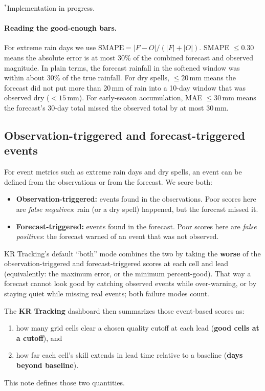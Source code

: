 \documentclass[11pt]{article}
\begin{document}
\vspace{-0.5em}
{\footnotesize \(^*\)Implementation in progress.}

\paragraph{Reading the good-enough bars.}
For extreme rain days we use
\(\mathrm{SMAPE}=|F-O|/(|F|+|O|)\).
SMAPE \(\le 0.30\) means the absolute error is at most 30\% of the combined
forecast and observed magnitude. In plain terms, the forecast rainfall in the
softened window was within about 30\% of the true rainfall.
For dry spells, \(\le 20\)\,mm means the forecast did not put more than 20\,mm
of rain into a 10-day window that was observed dry (\(<15\)\,mm).
For early-season accumulation, MAE \(\le 30\)\,mm means the forecast's 30-day
total missed the observed total by at most 30\,mm.

\subsection*{Observation-triggered and forecast-triggered events}

For event metrics such as extreme rain days and dry spells, an event can be
defined from the observations or from the forecast. We score both:

\begin{itemize}
  \item \textbf{Observation-triggered:} events found in the observations.
        Poor scores here are \emph{false negatives}: rain (or a dry spell)
        happened, but the forecast missed it.
  \item \textbf{Forecast-triggered:} events found in the forecast.
        Poor scores here are \emph{false positives}: the forecast warned of
        an event that was not observed.
\end{itemize}

KR Tracking's default ``both'' mode combines the two by taking the
\textbf{worse} of the observation-triggered and forecast-triggered scores
at each cell and lead (equivalently: the maximum error, or the minimum
percent-good). That way a forecast cannot look good by catching observed
events while over-warning, or by staying quiet while missing real events;
both failure modes count.

\vspace{0.5em}

The \textbf{KR Tracking} dashboard then summarizes those
event-based scores as:
\begin{enumerate}
  \item how many grid cells clear a chosen quality cutoff at each lead
        (\textbf{good cells at a cutoff}), and
  \item how far each cell's skill extends in lead time relative to a baseline
        (\textbf{days beyond baseline}).
\end{enumerate}
This note defines those two quantities.
\end{document}
